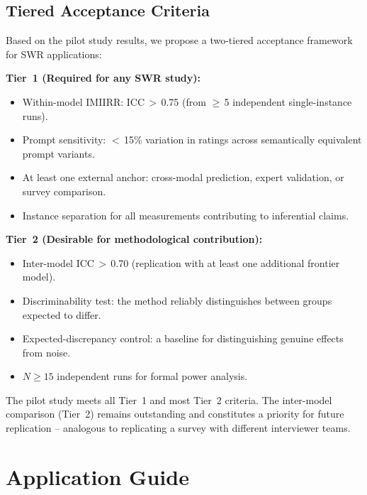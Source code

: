 \documentclass[11pt,a4paper]{article}
\begin{document}
\subsection{Tiered Acceptance Criteria}
\label{sec:qa:tiers}

Based on the pilot study results, we propose a two-tiered acceptance framework for SWR applications:

\textbf{Tier~1 (Required for any SWR study):}
\begin{itemize}[nosep]
  \item Within-model IMIIRR: ICC\,$>$\,0.75 (from $\geq$\,5 independent single-instance runs).
  \item Prompt sensitivity: $<$\,15\% variation in ratings across semantically equivalent prompt variants.
  \item At least one external anchor: cross-modal prediction, expert validation, or survey comparison.
  \item Instance separation for all measurements contributing to inferential claims.
\end{itemize}

\textbf{Tier~2 (Desirable for methodological contribution):}
\begin{itemize}[nosep]
  \item Inter-model ICC\,$>$\,0.70 (replication with at least one additional frontier model).
  \item Discriminability test: the method reliably distinguishes between groups expected to differ.
  \item Expected-discrepancy control: a baseline for distinguishing genuine effects from noise.
  \item $N \geq 15$ independent runs for formal power analysis.
\end{itemize}

The pilot study meets all Tier~1 and most Tier~2 criteria. The inter-model comparison (Tier~2) remains outstanding and constitutes a priority for future replication -- analogous to replicating a survey with different interviewer teams.


\section{Application Guide}
\label{sec:application}
\end{document}
